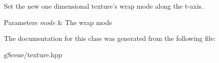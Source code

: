 Set the new one dimensional texture's wrap mode along the t-\/axis. 


\begin{DoxyParams}{Parameters}
{\em mode} & The wrap mode \\
\hline
\end{DoxyParams}


The documentation for this class was generated from the following file\-:\begin{DoxyCompactItemize}
\item 
g\-Scene/texture.\-hpp\end{DoxyCompactItemize}
